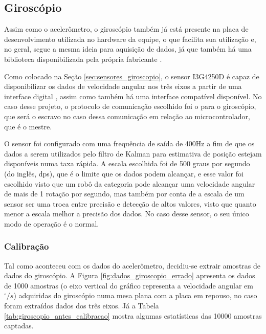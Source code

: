 \documentclass[acronym, symbols, table]{fei}
\begin{document}
	\subsection{Giroscópio}
	
	Assim como o acelerômetro, o giroscópio também já está presente na placa de desenvolvimento utilizada no hardware da equipe, o que facilita sua utilização e, no geral, segue a mesma ideia para aquisição de dados, já que também há uma biblioteca disponibilizada pela própria fabricante \cite{gyro_repository}.
	
	Como colocado na Seção \ref{sec:sensores_giroscopio}, o sensor I3G4250D é capaz de disponibilizar os dados de velocidade angular nos três eixos a partir de uma interface digital , assim como também há uma interface  compatível disponível. No caso desse projeto, o protocolo de comunicação escolhido foi o  para o giroscópio, que será o escravo no caso dessa comunicação em relação ao microcontrolador, que é o mestre.
	
	O sensor foi configurado com uma frequência de saída de 400Hz a fim de que os dados a serem utilizados pelo filtro de Kalman para estimativa de posição estejam disponíveis numa taxa rápida. A escala escolhida foi de 500 graus por segundo (do inglês, dps), que é o limite que os dados podem alcançar, e esse valor foi escolhido visto que um robô da categoria  pode alcançar uma velocidade angular de mais de 1 rotação por segundo, mas também por conta de a escala de um sensor ser uma troca entre precisão e detecção de altos valores, visto que quanto menor a escala melhor a precisão dos dados. No caso desse sensor, o seu único modo de operação é o normal.
	
	\subsubsection{Calibração}
	
	Tal como aconteceu com os dados do acelerômetro, decidiu-se extrair amostras de dados do giroscópio. A Figura \ref{fig:dados_giroscopio_errado} apresenta os dados de 1000 amostras (o eixo vertical do gráfico representa a velocidade angular em $^\circ/s$) adquiridas do giroscópio numa mesa plana com a placa em repouso, no caso foram extraídos dados dos três eixos. Já a Tabela \ref{tab:giroscopio_antes_calibracao} mostra algumas estatísticas das 10000 amostras captadas.
	
\end{document}
